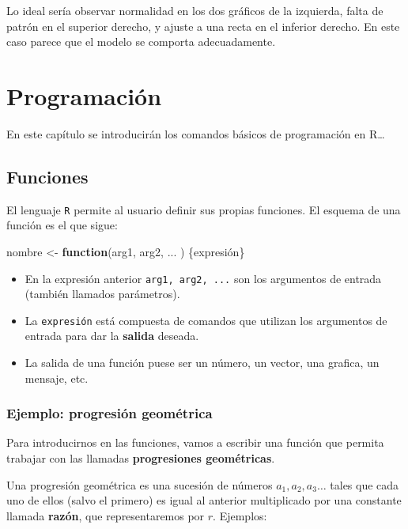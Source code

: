 \documentclass[]{book}
\newenvironment{Shaded}{\begin{snugshade}}{\end{snugshade}}
\newcommand{\StringTok}[1]{\textcolor[rgb]{0.31,0.60,0.02}{#1}}
\newcommand{\ControlFlowTok}[1]{\textcolor[rgb]{0.13,0.29,0.53}{\textbf{#1}}}
\newcommand{\NormalTok}[1]{#1}
\begin{document}
Lo ideal sería observar normalidad en los dos gráficos de la izquierda,
falta de patrón en el superior derecho, y ajuste a una recta en el
inferior derecho. En este caso parece que el modelo se comporta
adecuadamente.

\chapter{Programación}\label{programacion}

En este capítulo se introducirán los comandos básicos de programación en
R\ldots{}

\section{Funciones}\label{funciones}

El lenguaje \texttt{R} permite al usuario definir sus propias funciones.
El esquema de una función es el que sigue:

\begin{Shaded}
\begin{Highlighting}[]
\NormalTok{nombre <-}\StringTok{ }\ControlFlowTok{function}\NormalTok{(arg1, arg2, ... ) \{expresión\}}
\end{Highlighting}
\end{Shaded}

\begin{itemize}
\item
  En la expresión anterior \texttt{arg1,\ arg2,\ ...} son los argumentos
  de entrada (también llamados parámetros).
\item
  La \texttt{expresión} está compuesta de comandos que utilizan los
  argumentos de entrada para dar la \textbf{salida} deseada.
\item
  La salida de una función puese ser un número, un vector, una grafica,
  un mensaje, etc.
\end{itemize}

\subsection{Ejemplo: progresión
geométrica}\label{ejemplo-progresion-geometrica}

Para introducirnos en las funciones, vamos a escribir una función que
permita trabajar con las llamadas \textbf{progresiones geométricas}.

Una progresión geométrica es una sucesión de números
\(a_1, a_2, a_3\ldots\) tales que cada uno de ellos (salvo el primero)
es igual al anterior multiplicado por una constante llamada
\textbf{razón}, que representaremos por \(r\). Ejemplos:
\end{document}
